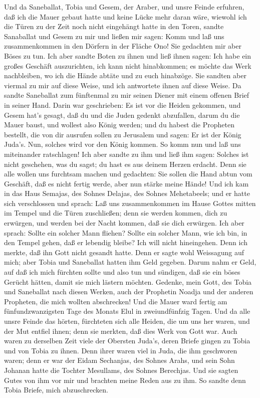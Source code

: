  Und da Saneballat, Tobia und Gesem, der Araber, und unsre
Feinde erfuhren, daß ich die Mauer gebaut hatte und keine Lücke mehr
daran wäre, wiewohl ich die Türen zu der Zeit noch nicht eingehängt
hatte in den Toren,  sandte Sanaballat und Gesem zu mir und
ließen mir sagen: Komm und laß uns zusammenkommen in den Dörfern in der
Fläche Ono! Sie gedachten mir aber Böses zu tun.  Ich aber
sandte Boten zu ihnen und ließ ihnen sagen: Ich habe ein großes Geschäft
auszurichten, ich kann nicht hinabkommen; es möchte das Werk
nachbleiben, wo ich die Hände abtäte und zu euch hinabzöge. 
Sie sandten aber viermal zu mir auf diese Weise, und ich antwortete
ihnen auf diese Weise.  Da sandte Saneballat zum fünftenmal
zu mir seinen Diener mit einem offenen Brief in seiner Hand.
 Darin war geschrieben: Es ist vor die Heiden gekommen, und
Gesem hat's gesagt, daß du und die Juden gedenkt abzufallen, darum du
die Mauer baust, und wollest also König werden;  und du
habest die Propheten bestellt, die von dir ausrufen sollen zu Jerusalem
und sagen: Er ist der König Juda's. Nun, solches wird vor den König
kommen. So komm nun und laß uns miteinander ratschlagen! 
Ich aber sandte zu ihm und ließ ihm sagen: Solches ist nicht geschehen,
was du sagst; du hast es aus deinem Herzen erdacht.  Denn
sie alle wollen uns furchtsam machen und gedachten: Sie sollen die Hand
abtun vom Geschäft, daß es nicht fertig werde, aber nun stärke meine
Hände!  Und ich kam in das Haus Semajas, des Sohnes
Delajas, des Sohnes Mehetabeels; und er hatte sich verschlossen und
sprach: Laß uns zusammenkommen im Hause Gottes mitten im Tempel und die
Türen zuschließen; denn sie werden kommen, dich zu erwürgen, und werden
bei der Nacht kommen, daß sie dich erwürgen.  Ich aber
sprach: Sollte ein solcher Mann fliehen? Sollte ein solcher Mann, wie
ich bin, in den Tempel gehen, daß er lebendig bleibe? Ich will nicht
hineingehen.  Denn ich merkte, daß ihn Gott nicht gesandt
hatte. Denn er sagte wohl Weissagung auf mich; aber Tobia und Saneballat
hatten ihm Geld gegeben.  Darum nahm er Geld, auf daß ich
mich fürchten sollte und also tun und sündigen, daß sie ein böses
Gerücht hätten, damit sie mich lästern möchten.  Gedenke,
mein Gott, des Tobia und Saneballat nach diesen Werken, auch der
Prophetin Noadja und der anderen Propheten, die mich wollten
abschrecken!  Und die Mauer ward fertig am
fünfundzwanzigsten Tage des Monats Elul in zweiundfünfzig Tagen.
 Und da alle unsre Feinde das hörten, fürchteten sich alle
Heiden, die um uns her waren, und der Mut entfiel ihnen; denn sie
merkten, daß dies Werk von Gott war.  Auch waren zu
derselben Zeit viele der Obersten Juda's, deren Briefe gingen zu Tobia
und von Tobia zu ihnen.  Denn ihrer waren viel in Juda, die
ihm geschworen waren; denn er war der Eidam Sechanjas, des Sohnes Arahs,
und sein Sohn Johanan hatte die Tochter Mesullams, des Sohnes Berechjas.
 Und sie sagten Gutes von ihm vor mir und brachten meine
Reden aus zu ihm. So sandte denn Tobia Briefe, mich abzuschrecken.

